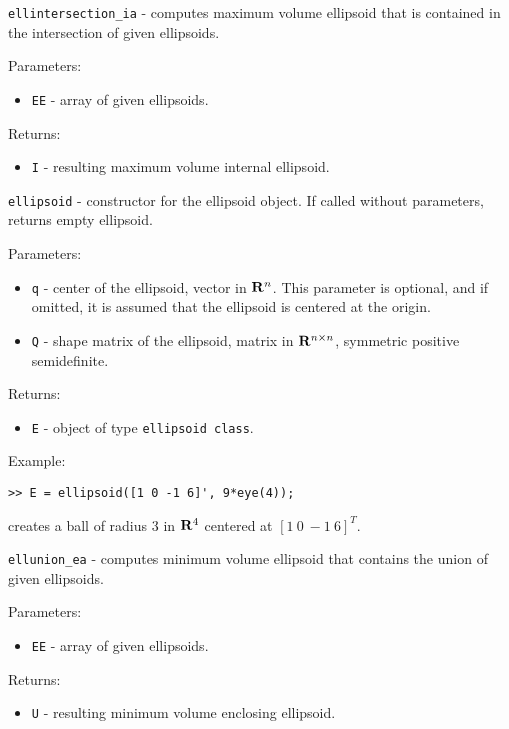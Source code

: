 \newpage

{\Large {\tt ellintersection\_ia}} - computes maximum volume ellipsoid that
is contained in the intersection of given ellipsoids.

Parameters:
\begin{itemize}
\item {\tt EE} - array of given ellipsoids.
\end{itemize}

Returns:
\begin{itemize}
\item {\tt I} - resulting maximum volume internal ellipsoid.
\end{itemize}

\newpage

{\Large {\tt ellipsoid}} - constructor for the ellipsoid object.
If called without parameters, returns empty ellipsoid.

Parameters:
\begin{itemize}
\item {\tt q} - center of the ellipsoid, vector in ${\bf R}^n$.
This parameter is optional, and if omitted, it is assumed that the ellipsoid
is centered at the origin.
\item {\tt Q} - shape matrix of the ellipsoid, matrix in ${\bf R}^{n\times n}$,
symmetric positive semidefinite.
\end{itemize}
Returns:
\begin{itemize}
\item {\tt E} - object of type {\tt ellipsoid class}.
\end{itemize}
Example:
{\tt \begin{verbatim}
>> E = ellipsoid([1 0 -1 6]', 9*eye(4));
\end{verbatim} }
creates a ball of radius $3$ in ${\bf R}^4$ centered at $[1 ~ 0 ~ -1 ~ 6]^T$.

\newpage

{\Large {\tt ellunion\_ea}} - computes minimum volume ellipsoid that
contains the union of given ellipsoids.

Parameters:
\begin{itemize}
\item {\tt EE} - array of given ellipsoids.
\end{itemize}

Returns:
\begin{itemize}
\item {\tt U} - resulting minimum volume enclosing ellipsoid.
\end{itemize}

